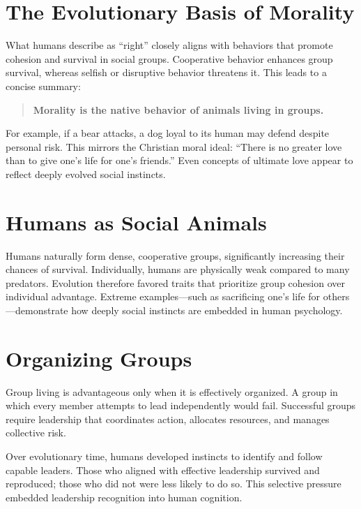 \section{The Evolutionary Basis of Morality}

What humans describe as ``right'' closely aligns with behaviors that promote cohesion and survival in social groups. Cooperative behavior enhances group survival, whereas selfish or disruptive behavior threatens it. This leads to a concise summary:

\begin{quote}
\textbf{Morality is the native behavior of animals living in groups.}
\end{quote}

For example, if a bear attacks, a dog loyal to its human may defend despite personal risk. This mirrors the Christian moral ideal: ``There is no greater love than to give one’s life for one’s friends.'' Even concepts of ultimate love appear to reflect deeply evolved social instincts.

\section{Humans as Social Animals}

Humans naturally form dense, cooperative groups, significantly increasing their chances of survival. Individually, humans are physically weak compared to many predators. Evolution therefore favored traits that prioritize group cohesion over individual advantage. Extreme examples---such as sacrificing one’s life for others---demonstrate how deeply social instincts are embedded in human psychology.

\section{Organizing Groups}

Group living is advantageous only when it is effectively organized. A group in which every member attempts to lead independently would fail. Successful groups require leadership that coordinates action, allocates resources, and manages collective risk.

Over evolutionary time, humans developed instincts to identify and follow capable leaders. Those who aligned with effective leadership survived and reproduced; those who did not were less likely to do so. This selective pressure embedded leadership recognition into human cognition.


